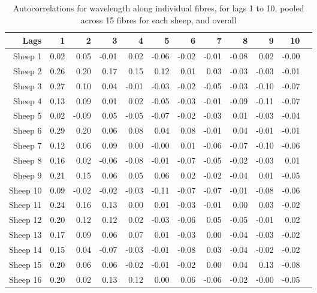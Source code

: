 \begin{table}[htp]
\centering
\caption{Autocorrelations for wavelength along individual fibres, for lags 1 to 10,  pooled across 15 fibres for each sheep, and overall}
\label{tab:acfw}
\vspace{0.1in}
\begin{tabular}{rrrrrrrrrrrr}
  \hline
 Lags & 1 & 2 & 3 & 4 & 5 & 6 & 7 & 8 & 9 & 10  \\ 
  \hline
Sheep 1 &   0.02 & 0.05 & -0.01 & 0.02 & -0.06 & -0.02 & -0.01 & -0.08 & 0.02 & -0.00 \\ 
Sheep 2   & 0.26 & 0.20 & 0.17 & 0.15 & 0.12 & 0.01 & 0.03 & -0.03 & -0.03 & -0.01 \\ 
Sheep 3   & 0.27 & 0.10 & 0.04 & -0.01 & -0.03 & -0.02 & -0.05 & -0.03 & -0.10 & -0.07 \\ 
Sheep 4   & 0.13 & 0.09 & 0.01 & 0.02 & -0.05 & -0.03 & -0.01 & -0.09 & -0.11 & -0.07 \\ 
Sheep 5   & 0.02 & -0.09 & 0.05 & -0.05 & -0.07 & -0.02 & -0.03 & 0.01 & -0.03 & -0.04 \\ 
Sheep  6   & 0.29 & 0.20 & 0.06 & 0.08 & 0.04 & 0.08 & -0.01 & 0.04 & -0.01 & -0.01 \\ 
Sheep  7   & 0.12 & 0.06 & 0.09 & 0.00 & -0.00 & 0.01 & -0.06 & -0.07 & -0.10 & -0.06 \\ 
Sheep  8   & 0.16 & 0.02 & -0.06 & -0.08 & -0.01 & -0.07 & -0.05 & -0.02 & -0.03 & 0.01 \\ 
Sheep  9   & 0.21 & 0.15 & 0.06 & 0.05 & 0.06 & 0.02 & -0.02 & -0.04 & 0.01 & -0.05 \\ \hline
Sheep  10   & 0.09 & -0.02 & -0.02 & -0.03 & -0.11 & -0.07 & -0.07 & -0.01 & -0.08 & -0.06 \\ 
Sheep  11   & 0.24 & 0.16 & 0.13 & 0.00 & 0.01 & -0.03 & -0.01 & 0.00 & 0.03 & -0.02 \\ 
Sheep  12   & 0.20 & 0.12 & 0.12 & 0.02 & -0.03 & -0.06 & 0.05 & -0.05 & -0.01 & 0.02 \\ 
Sheep  13   & 0.17 & 0.09 & 0.06 & 0.07 & 0.01 & -0.03 & 0.00 & -0.04 & -0.03 & -0.02 \\ 
Sheep  14   & 0.15 & 0.04 & -0.07 & -0.03 & -0.01 & -0.08 & 0.03 & -0.04 & -0.02 & -0.02 \\ 
Sheep  15   & 0.20 & 0.06 & 0.06 & -0.02 & -0.01 & -0.02 & 0.00 & 0.04 & 0.13 & -0.08 \\  \hline
Sheep  16   & 0.20 & 0.02 & 0.13 & 0.12 & 0.00 & 0.06 & -0.06 & -0.02 & -0.00 & -0.05 \\ 

\end{tabular}
\end{table}
